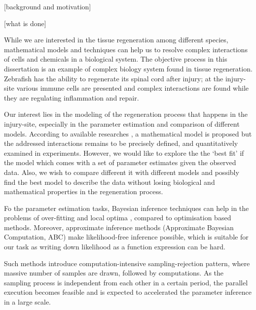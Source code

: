 \documentclass[12pt,a4paper]{report}
\begin{document}


[background and motivation]

[what is done]

While we are interested in the tissue regeneration among different species, mathematical models and techniques can help us to resolve complex interactions of cells and chemicals in a biological system. The objective process in this dissertation is an example of complex biology system found in tissue regeneration. Zebrafish has the ability to regenerate its spinal cord after injury; at the injury-site various immune cells are presented and complex interactions are found while they are regulating inflammation and repair.

Our interest lies in the modeling of the regeneration process that happens in the injury-site, especially in the parameter estimation and comparison of different models. According to available researches \cite{ref:Tsarouchas}, a mathematical model is proposed but the addressed interactions remains to be precisely defined, and quantitatively examined in experiments. However, we would like to explore the the `best fit' if the model which comes with a set of parameter estimates given the observed data. Also, we wish to compare different it with different models and possibly find the best model to describe the data without losing biological and mathematical properties in the regeneration process.

Fo the parameter estimation tasks, Bayesian inference techniques can help in the problems of over-fitting and local optima \cite{ref:abcsysbio}, compared to optimisation based methods. Moreover, approximate inference methods (Approximate Bayesian Computation, ABC) make likelihood-free inference possible, which is suitable for our task as writing down likelihood as a function expression can be hard.

Such methods introduce computation-intensive sampling-rejection pattern, where massive number of samples are drawn, followed by computations. As the sampling process is independent from each other in a certain period, the parallel execution becomes feasible and is expected to accelerated the parameter inference in a large scale.
\end{document}
